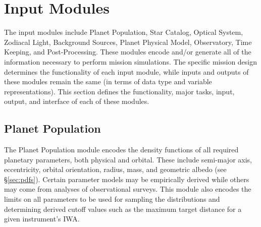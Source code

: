 \documentclass[cleanfoot]{asme2ej}
\begin{document}

\section{Input Modules}\label{sec:modules}
The input modules include Planet Population, Star Catalog, Optical System, Zodiacal Light, Background Sources, Planet Physical Model, Observatory, Time Keeping, and Post-Processing.  These modules encode and/or generate all of the information necessary to perform mission simulations.  The specific mission design determines the functionality of each input module, while inputs and outputs of these modules remain the same (in terms of data type and variable representations).  This section defines the functionality, major tasks, input, output, and interface of each of these modules.


\subsection{Planet Population}
The Planet Population module encodes the density functions of all required planetary parameters, both physical and orbital. These include semi-major axis, eccentricity, orbital orientation, radius, mass, and geometric albedo (see \S\ref{sec:pdfs}). Certain parameter models may be empirically derived while others may come from analyses of observational surveys.  This module also encodes the limits on all parameters to be used for sampling the distributions and determining derived cutoff values such as the maximum target distance for a given instrument's IWA.
\end{document}

